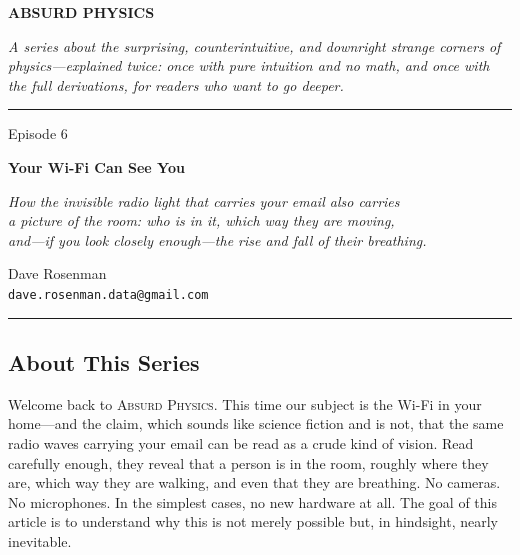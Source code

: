 \documentclass[11pt, letterpaper]{article}
\newcommand{\seriesname}{\textsc{Absurd Physics}}
\begin{document}

\begin{center}
\vspace*{1.5cm}

{\fontsize{36}{42}\selectfont\bfseries\textcolor{accentblue}{ABSURD PHYSICS}}

\vspace{8pt}
{\large\textcolor{seriestitle}{\textit{A series about the surprising, counterintuitive, and downright strange corners of physics---explained twice: once with pure intuition and no math, and once with the full derivations, for readers who want to go deeper.}}}

\vspace{1.5cm}
\rule{0.6\textwidth}{0.5pt}
\vspace{1.5cm}

{\fontsize{24}{30}\selectfont Episode 6}

\vspace{10pt}

{\fontsize{28}{34}\selectfont\bfseries Your Wi-Fi Can See You}

\vspace{8pt}
{\large\textit{How the invisible radio light that carries your email also carries\\ a picture of the room: who is in it, which way they are moving,\\ and---if you look closely enough---the rise and fall of their breathing.}}

\vspace{1.5cm}

{\large Dave Rosenman}\\[4pt]
{\normalsize \texttt{dave.rosenman.data@gmail.com}}

\vspace{1.5cm}
\rule{0.6\textwidth}{0.5pt}
\end{center}

\vspace{1cm}

\subsection*{About This Series}

Welcome back to \seriesname. This time our subject is the Wi-Fi in your home---and the claim, which sounds like science fiction and is not, that the same radio waves carrying your email can be read as a crude kind of vision. Read carefully enough, they reveal that a person is in the room, roughly where they are, which way they are walking, and even that they are breathing. No cameras. No microphones. In the simplest cases, no new hardware at all. The goal of this article is to understand why this is not merely possible but, in hindsight, nearly inevitable.
\end{document}
